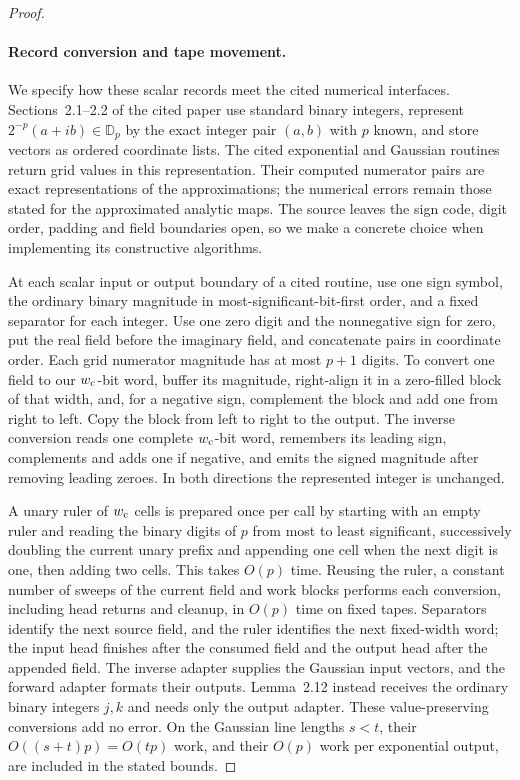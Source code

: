 \documentclass[11pt]{article}
\theoremstyle{definition}
\begin{document}
\begin{proof}
\paragraph{Record conversion and tape movement.}
We specify how these scalar records meet the cited numerical interfaces.
Sections~2.1--2.2 of the cited paper use standard binary integers, represent
$2^{-p}(a+ib)\in\mathbb D_p$ by the exact integer pair $(a,b)$ with $p$
known, and store vectors as ordered coordinate lists. The cited
exponential and Gaussian routines return grid values in this
representation. Their computed numerator pairs are exact representations
of the approximations; the numerical errors remain those stated for the
approximated analytic maps. The source leaves the sign code, digit order,
padding and field boundaries open, so we make a concrete choice when
implementing its constructive algorithms.

At each scalar input or output boundary of a cited routine, use one sign
symbol, the ordinary binary magnitude in most-significant-bit-first order,
and a fixed separator for
each integer. Use one zero digit and the nonnegative sign for zero, put
the real field before the imaginary field, and concatenate pairs in
coordinate order. Each grid numerator magnitude has at most $p+1$ digits.
To convert one field to our $w_{\rm c}$-bit word, buffer its magnitude, right-align
it in a zero-filled block of that width, and, for a negative sign,
complement the block and add one from right to left. Copy the block from
left to right to the output. The inverse conversion reads one complete
$w_{\rm c}$-bit word, remembers its leading sign, complements and adds
one if negative, and emits the signed magnitude after removing leading
zeroes. In both directions the represented integer is unchanged.

A unary ruler of $w_{\rm c}$ cells is prepared once per call by starting
with an empty ruler and reading the binary digits of $p$ from most to least
significant, successively doubling the current unary prefix
and appending one cell when the next digit is one, then adding two cells.
This takes $O(p)$ time. Reusing the ruler, a constant
number of sweeps of the current field and work blocks performs each
conversion, including head returns and cleanup, in $O(p)$ time on fixed
tapes. Separators identify the next source field, and the ruler identifies
the next fixed-width word; the input head finishes after the consumed
field and the output head after the appended field. The inverse adapter
supplies the Gaussian input vectors, and the forward adapter formats their
outputs. Lemma~2.12 instead receives the ordinary binary integers $j,k$
and needs only the output adapter. These value-preserving conversions add
no error. On the Gaussian line lengths $s<t$, their
$O((s+t)p)=O(tp)$ work, and their $O(p)$ work per exponential output,
are included in the stated bounds.


\end{proof}
\end{document}
